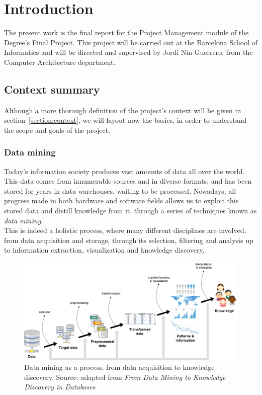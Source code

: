 \section{Introduction}
\label{section:introduction}

The present work is the final report for the Project Management module of the Degree's Final Project. This project will be carried out at the Barcelona School of Informatics and will be directed and supervised by Jordi Nin Guerrero, from the Computer Architecture department.

\subsection{Context summary}

Although a more thorough definition of the project's context will be given in section~\ref{section:context}, we will layout now the basics, in order to understand the scope and goals of the project.

\subsubsection{Data mining}
Today’s information society produces vast amounts of data all over the world. This data comes from innumerable sources and in diverse formats, and has been stored for years in data warehouses, waiting to be processed. Nowadays, all progress made in both hardware and software fields allows us to exploit this stored data and distill knowledge from it, through a series of techniques known as \textit{data mining}.\\

This is indeed a holistic process, where many different disciplines are involved, from data acquisition and storage, through its selection, filtering and analysis up to information extraction, visualization and knowledge discovery.\\

\begin{figure}[h]
	\centering
	\includegraphics[width=0.8\linewidth]{figures/Untitled.png}
	\caption{Data mining as a process, from data acquisition to knowledge discovery. Source: adapted from \textit{From Data Mining to Knowledge Discovery in Databases}~\cite{Fayyad:1996:DMK:257938.257942}}
	\label{fig:data-mining}
\end{figure}


